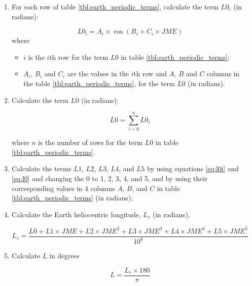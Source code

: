 \documentclass{article}
\begin{document}
\begin{enumerate}

\item \label{item:step_1} For each row of table
  \ref{tbl:earth_periodic_terms}, calculate the term $L0_i$ (in
  radians):

  \begin{equation}
    \label{eq:l0i}
    L0_i = A_i \times \cos\left(B_i + C_i \times JME\right)
  \end{equation}
  where
  \begin{itemize}
  \item $i$ is the $i$th row for the term $L0$ in table
    \ref{tbl:earth_periodic_terms};
  \item $A_i$, $B_i$ and $C_i$ are the values in the $i$th row and
    $A$, $B$ and $C$ columns in the table
    \ref{tbl:earth_periodic_terms}, for the term $L0$ (in radians).
  \end{itemize}

\item Calculate the term $L0$ (in radians):

  \begin{equation}
    \label{eq:l0}
    L0 = \sum_{i=0}^{n}L0_i
  \end{equation}
  \par where $n$ is the number of rows for the term $L0$ in table
  \ref{tbl:earth_periodic_terms}.

\item \label{item:step_3} Calculate the terms $L1$, $L2$, $L3$, $L4$,
  and $L5$ by using equations \ref{eq:l0i} and \ref{eq:l0} and
  changing the 0 to 1, 2, 3, 4, and 5, and by using their
  corresponding values in 4 columns $A$, $B$, and $C$ in table
  \ref{tbl:earth_periodic_terms} (in radians);

\item \label{item:step_4} Calculate the Earth heliocentric longitude,
  $L_r$ (in radians),

  \begin{equation}
    \label{eq:l}
    L_r = \frac{L0 + L1 \times JME + L2 \times JME^2 + L3 \times JME^3 + L4 \times JME^4 + L5 \times JME^5}{10^8}
  \end{equation}

\item \label{item:step_5} Calculate $L$ in degrees

  \begin{equation}
    \label{eq:l_in_degrees}
    L = \frac{L_r \times 180}{\pi}
  \end{equation}


\end{enumerate}
\end{document}
